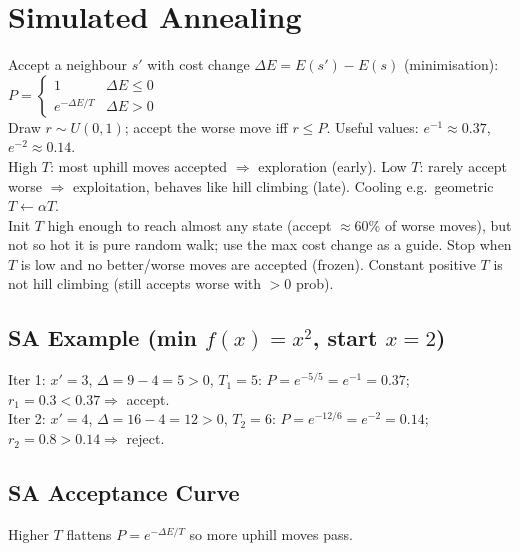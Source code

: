 \section{Simulated Annealing}
Accept a neighbour \(s'\) with cost change \(\Delta E=E(s')-E(s)\) (minimisation):\\
\(P=\begin{cases}1 & \Delta E\le 0\\ e^{-\Delta E/T} & \Delta E>0\end{cases}\)\\
Draw \(r\sim U(0,1)\); accept the worse move iff \(r\le P\). Useful values: \(e^{-1}\!\approx\!0.37\), \(e^{-2}\!\approx\!0.14\).\\
High \(T\): most uphill moves accepted \(\Rightarrow\) exploration (early). Low \(T\): rarely accept worse \(\Rightarrow\) exploitation, behaves like hill climbing (late). Cooling e.g.\ geometric \(T\leftarrow\alpha T\).\\
Init \(T\) high enough to reach almost any state (accept \(\approx\)60\% of worse moves), but not so hot it is pure random walk; use the max cost change as a guide. Stop when \(T\) is low and no better/worse moves are accepted (frozen). Constant positive \(T\) is not hill climbing (still accepts worse with \(>0\) prob).

\subsection*{SA Example (min \(f(x)=x^2\), start \(x{=}2\))}
Iter 1: \(x'{=}3\), \(\Delta=9-4=5>0\), \(T_1{=}5\): \(P=e^{-5/5}=e^{-1}=0.37\); \(r_1{=}0.3<0.37\Rightarrow\) accept.\\
Iter 2: \(x'{=}4\), \(\Delta=16-4=12>0\), \(T_2{=}6\): \(P=e^{-12/6}=e^{-2}=0.14\); \(r_2{=}0.8>0.14\Rightarrow\) reject.

\subsection*{SA Acceptance Curve}
Higher \(T\) flattens \(P=e^{-\Delta E/T}\) so more uphill moves pass.

